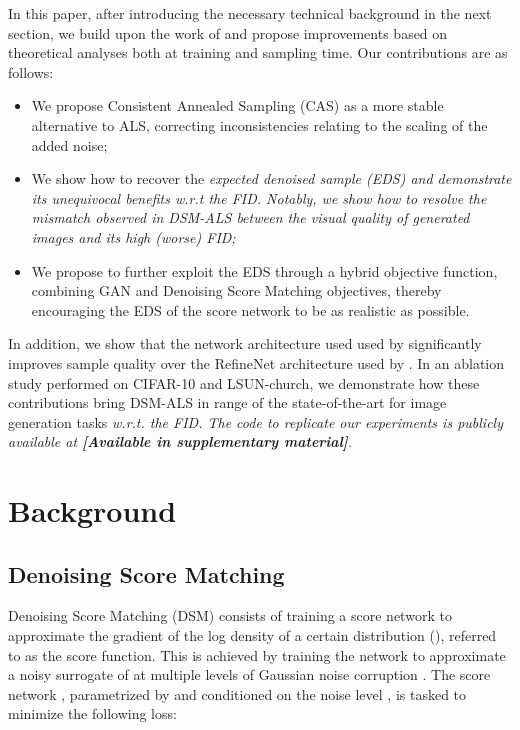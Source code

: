 \documentclass{article} \usepackage{iclr2021_conference_notitle,times}
\theoremstyle{definition}
\theoremstyle{definition}
\begin{document}
In this paper, after introducing the necessary technical background in the next section, we build upon the work of \citet{song2020improved} and propose improvements based on theoretical analyses both at training and sampling time. Our contributions are as follows:

\begin{itemize}
 \item We propose Consistent Annealed Sampling (CAS) as a more stable alternative to ALS, correcting inconsistencies relating to the scaling of the added noise;
 \item We show how to recover the \em expected denoised sample \em (EDS) and demonstrate its unequivocal benefits \em w.r.t \em the FID. Notably, we show how to resolve the mismatch observed in DSM-ALS between the visual quality of generated images and its high (worse) FID;
 \item We propose to further exploit the EDS through a hybrid objective function, combining GAN and Denoising Score Matching objectives, thereby encouraging the EDS of the score network to be as realistic as possible.
\end{itemize}

In addition, we show that the network architecture used used by \citet{ho2020denoising} significantly improves sample quality over the RefineNet \citep{lin2017refinenet} architecture used by \citet{song2020improved}. In an ablation study performed on CIFAR-10 and LSUN-church, we demonstrate how these contributions bring DSM-ALS in range of the state-of-the-art for image generation tasks \em w.r.t. \em the FID. The code to replicate our experiments is publicly available at 
\textbf{[Available in supplementary material]}.


\section{Background}\label{sec:back}

\subsection{Denoising Score Matching}

Denoising Score Matching (DSM) \citep{hyvarinen2005estimation} consists of training a score network to approximate the gradient of the log density of a certain distribution (), referred to as the score function. This is achieved by training the network to approximate a noisy surrogate of  at multiple levels of Gaussian noise corruption \citep{vincent2011connection}.
The score network , parametrized by  and conditioned on the noise level , is tasked to minimize the following loss:
\end{document}

